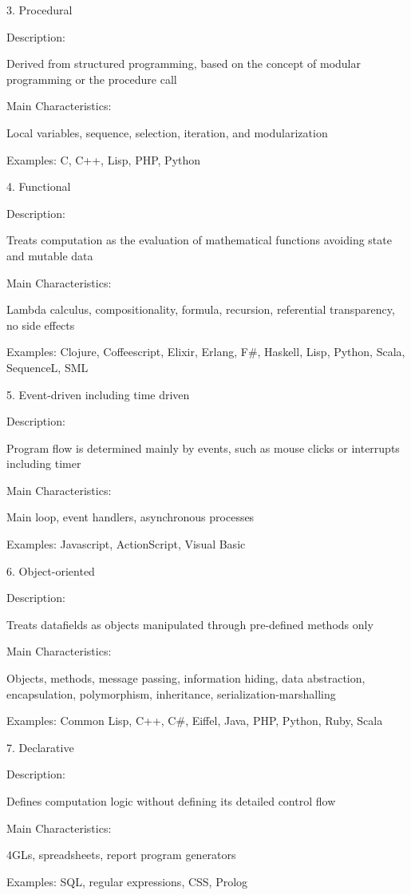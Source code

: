 3. Procedural

Description:

Derived from structured programming, based on the concept of modular programming or the procedure call

Main Characteristics:

Local variables, sequence, selection, iteration, and modularization

Examples: C, C++, Lisp, PHP, Python

4. Functional


Description:

Treats computation as the evaluation of mathematical functions avoiding state and mutable data

Main Characteristics:

Lambda calculus, compositionality, formula, recursion, referential transparency, no side effects

Examples: Clojure, Coffeescript, Elixir, Erlang, F#, Haskell, Lisp, Python, Scala, SequenceL, SML

5. Event-driven including time driven

Description:

Program flow is determined mainly by events, such as mouse clicks or interrupts including timer

Main Characteristics:

Main loop, event handlers, asynchronous processes

Examples: Javascript, ActionScript, Visual Basic

6. Object-oriented

Description:

Treats datafields as objects manipulated through pre-defined methods only

Main Characteristics:

Objects, methods, message passing, information hiding, data abstraction, encapsulation, polymorphism, inheritance, serialization-marshalling

Examples: Common Lisp, C++, C#, Eiffel, Java, PHP, Python, Ruby, Scala

7. Declarative

Description:

Defines computation logic without defining its detailed control flow

Main Characteristics:

4GLs, spreadsheets, report program generators

Examples: SQL, regular expressions, CSS, Prolog

